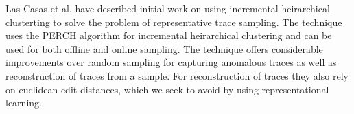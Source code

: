 Las-Casas et al. \cite{Las-Casas:2018:WSE:3267809.3267841} have described initial work on using incremental heirarchical clusterting to solve the problem of representative trace sampling.
The technique uses the PERCH \cite{Kobren:2017:HAE:3097983.3098079} algorithm for incremental heirarchical clustering and can be used for both offline and online sampling.
The technique offers considerable improvements over random sampling for capturing anomalous traces as well as reconstruction of traces from a sample.
For reconstruction of traces they also rely on euclidean edit distances, which we seek to avoid by using representational learning.

